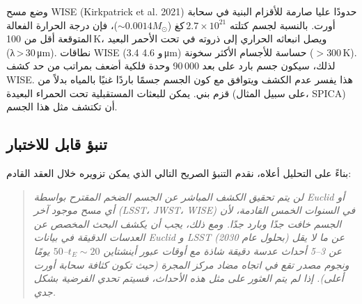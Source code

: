 \documentclass[11pt,a4paper]{article}
\begin{document}
	وضع مسح WISE (Kirkpatrick et al. 2021) حدودًا عليا صارمة للأقزام البنية في سحابة أورت. بالنسبة لجسم كتلته \(2.7\times10^{21}\) كغ (\(\sim 0.0014 M_{\odot}\))، فإن درجة الحرارة الفعالة المتوقعة أقل من 100 K، ويصل انبعاثه الحراري إلى ذروته في تحت الأحمر البعيد (λ > 30 μm). نطاقات WISE (3.4 و 4.6 μm) حساسة للأجسام الأكثر سخونة (\(>300\) K). لذلك، سيكون جسم بارد على بعد 90 000 وحدة فلكية أضعف بمراتب من حد كشف WISE. هذا يفسر عدم الكشف ويتوافق مع كون الجسم جسمًا باردًا غنيًا بالمياه بدلاً من قزم بني. يمكن للبعثات المستقبلية تحت الحمراء البعيدة (على سبيل المثال، SPICA) أن تكتشف مثل هذا الجسم.
	
	\subsection{تنبؤ قابل للاختبار}
	
	بناءً على التحليل أعلاه، نقدم التنبؤ الصريح التالي الذي يمكن تزويره خلال العقد القادم:
	
	\begin{quote}
		\itshape
		لن يتم تحقيق الكشف المباشر عن الجسم الضخم المقترح بواسطة Euclid أو أي مسح موجود آخر (LSST، JWST، WISE) في السنوات الخمس القادمة، لأن الجسم خافت جدًا وبارد جدًا. ومع ذلك، يجب أن يكشف البحث المخصص عن العدسات الدقيقة في بيانات Euclid و LSST (بحلول عام 2030) عن ما لا يقل عن 3–5 أحداث عدسة دقيقة شاذة مع أوقات عبور أينشتاين \(t_E \sim 20\)–\(50\) يومًا ونجوم مصدر تقع في اتجاه مضاد مركز المجرة (حيث تكون كثافة سحابة أورت أعلى). إذا لم يتم العثور على مثل هذه الأحداث، فسيتم تحدي الفرضية بشكل جدي.
	\end{quote}
	
\end{document}
